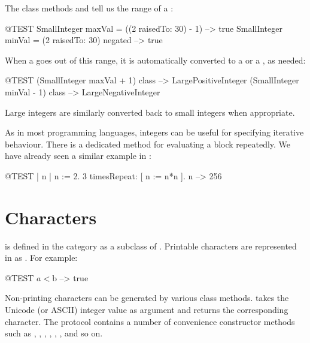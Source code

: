 \documentclass[a4paper,10pt,twoside]{book}
\begin{document}
The class methods  and  tell us the range of a :

\begin{code}{@TEST}
SmallInteger maxVal = ((2 raisedTo: 30) - 1)      --> true
SmallInteger minVal = (2 raisedTo: 30) negated --> true
\end{code}

When a  goes out of this range, it is automatically converted to a  or a , as needed:

\begin{code}{@TEST}
(SmallInteger maxVal + 1) class --> LargePositiveInteger
(SmallInteger minVal - 1) class  --> LargeNegativeInteger
\end{code}

Large integers are similarly converted back to small integers when appropriate.

As in most programming languages, integers can be useful for specifying iterative behaviour.  There is a dedicated method  for evaluating a block repeatedly.
We have already seen a similar example in :
\begin{code}{@TEST | n |}
n := 2.
3 timesRepeat: [ n := n*n ].
n --> 256
\end{code}

\section{Characters}

 is defined in the  category as a subclass of . Printable characters are represented in \pharo as .  For example:

\begin{code}{@TEST}
$a < $b --> true
\end{code}

Non-printing characters can be generated by various class methods.  \mbox{} takes the Unicode (or ASCII) integer value as argument and returns the corresponding character. The protocol  contains a number of convenience constructor methods such as , , , , , , and so on.
\end{document}
